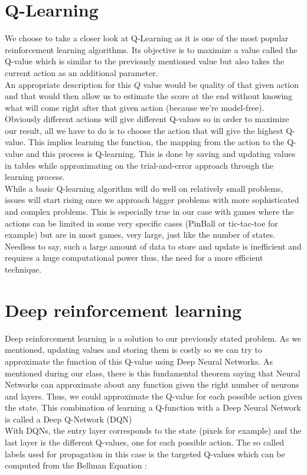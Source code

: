 \documentclass[a4paper,12pt,calibri,oneside,openany]{book}
\theoremstyle{break}
\begin{document}
\section{Q-Learning}
\qquad We choose to take a closer look at Q-Learning as it is one of the most popular reinforcement learning algorithms. Its objective is to maximize a value called the Q-value which is similar to the previously mentioned value but also takes the current action as an additional parameter.\\

An appropriate description for this $Q$ value would be quality of that given action and that would then allow us to estimate the score at the end without knowing what will come right after that given action (because we're model-free).\\

Obviously different actions will give different Q-values so in order to maximize our result, all we have to do is to choose the action that will give the highest Q-value. This implies learning the function, the mapping from the action to the Q-value and this process is Q-learning. This is done by saving and updating values in tables while approximating on the trial-and-error approach through the learning process.\\

While a basic Q-learning algorithm will do well on relatively small problems, issues will start rising once we approach bigger problems with more sophisticated and complex problems. This is especially true in our case with games where the actions can be limited in some very specific cases (PinBall or tic-tac-toe for example) but are in most games, very large, just like the number of states. Needless to say, such a large amount of data to store and update is inefficient and requires a huge computational power thus, the need for a more efficient technique.
\section{Deep reinforcement learning}
\qquad Deep reinforcement learning is a solution to our previously stated problem. As we mentioned, updating values and storing them is costly so we can try to approximate the function of this Q-value using Deep Neural Networks. As mentioned during our class, there is this fundamental theorem saying that Neural Networks can approximate about any function given the right number of neurons and layers. Thus, we could approximate the Q-value for each possible action given the state. This combination of learning a Q-function with a Deep Neural Network is called a Deep Q-Network (DQN)\\
\clearpage
With DQNs, the entry layer corresponds to the state (pixels for example) and the last layer is the different Q-values, one for each possible action. The so called labels used for propagation in this case is the targeted Q-values which can be computed from the Bellman Equation :
\end{document}

